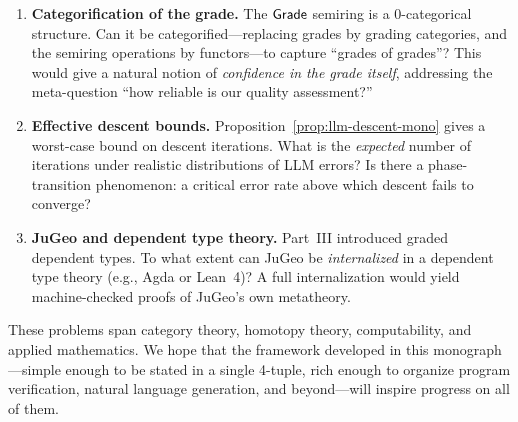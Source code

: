 \begin{enumerate}
  \item \textbf{Categorification of the grade.}\;
        The $\mathsf{Grade}$ semiring is a 0-categorical structure.  Can it
        be categorified---replacing grades by grading categories,
        and the semiring operations by functors---to capture
        ``grades of grades''?  This would give a natural notion of
        \emph{confidence in the grade itself}, addressing the
        meta-question ``how reliable is our quality assessment?''

  \item \textbf{Effective descent bounds.}\;
        Proposition~\ref{prop:llm-descent-mono} gives a worst-case
        bound on descent iterations.  What is the \emph{expected}
        number of iterations under realistic distributions of LLM
        errors?  Is there a phase-transition phenomenon: a critical
        error rate above which descent fails to converge?

  \item \textbf{JuGeo and dependent type theory.}\;
        Part~III introduced graded dependent types.  To what extent
        can JuGeo be \emph{internalized} in a dependent type theory
        (e.g., Agda or Lean~4)?  A full internalization would yield
        machine-checked proofs of JuGeo's own metatheory.
\end{enumerate}

\bigskip

These problems span category theory, homotopy theory, computability,
and applied mathematics.  We hope that the framework developed in
this monograph---simple enough to be stated in a single 4-tuple,
rich enough to organize program verification, natural language
generation, and beyond---will inspire progress on all of them.
